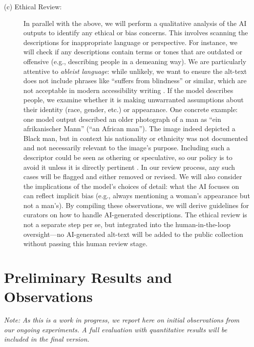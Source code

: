 \documentclass{anthology-ch}         %
\begin{document}
\begin{description}
\item[(c) Ethical Review:] In parallel with the above, we will perform a qualitative analysis of the AI outputs to identify any ethical or bias concerns. This involves scanning the descriptions for inappropriate language or perspective. For instance, we will check if any descriptions contain terms or tones that are outdated or offensive (e.g., describing people in a demeaning way). We are particularly attentive to \emph{ableist language}: while unlikely, we want to ensure the alt-text does not include phrases like ``suffers from blindness'' or similar, which are not acceptable in modern accessibility writing \autocite{holmes2020}. If the model describes people, we examine whether it is making unwarranted assumptions about their identity (race, gender, etc.) or appearance. One concrete example: one model output described an older photograph of a man as ``ein afrikanischer Mann'' (``an African man''). The image indeed depicted a Black man, but in context his nationality or ethnicity was not documented and not necessarily relevant to the image’s purpose. Including such a descriptor could be seen as othering or speculative, so our policy is to avoid it unless it is directly pertinent \autocite{hanley2021}. In our review process, any such cases will be flagged and either removed or revised. We will also consider the implications of the model’s choices of detail: what the AI focuses on can reflect implicit bias (e.g., always mentioning a woman’s appearance but not a man’s). By compiling these observations, we will derive guidelines for curators on how to handle AI-generated descriptions. The ethical review is not a separate step per se, but integrated into the human-in-the-loop oversight---no AI-generated alt-text will be added to the public collection without passing this human review stage.
\end{description}

\section{Preliminary Results and Observations}

\emph{Note: As this is a work in progress, we report here on initial observations from our ongoing experiments. A full evaluation with quantitative results will be included in the final version.}
\end{document}
